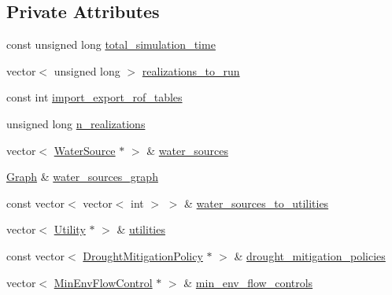 \subsection*{Private Attributes}
\begin{DoxyCompactItemize}
\item 
const unsigned long \mbox{\hyperlink{classSimulation_a6c7ad426929c59e061750b6d923aa859_a6c7ad426929c59e061750b6d923aa859}{total\+\_\+simulation\+\_\+time}}
\item 
vector$<$ unsigned long $>$ \mbox{\hyperlink{classSimulation_a6753fbf18cf9793b0ea3f4c070836af3_a6753fbf18cf9793b0ea3f4c070836af3}{realizations\+\_\+to\+\_\+run}}
\item 
const int \mbox{\hyperlink{classSimulation_a0989380cd166a60c2ba8bb2a1a9c138c_a0989380cd166a60c2ba8bb2a1a9c138c}{import\+\_\+export\+\_\+rof\+\_\+tables}}
\item 
unsigned long \mbox{\hyperlink{classSimulation_ab365c523e28a3af3be06e251b478e2b0_ab365c523e28a3af3be06e251b478e2b0}{n\+\_\+realizations}}
\item 
vector$<$ \mbox{\hyperlink{classWaterSource}{Water\+Source}} $\ast$ $>$ \& \mbox{\hyperlink{classSimulation_a7cf5edb885d26074e51e183408a3adab_a7cf5edb885d26074e51e183408a3adab}{water\+\_\+sources}}
\item 
\mbox{\hyperlink{classGraph}{Graph}} \& \mbox{\hyperlink{classSimulation_a04d4514b77ae98ec66cb8c2d633b2a52_a04d4514b77ae98ec66cb8c2d633b2a52}{water\+\_\+sources\+\_\+graph}}
\item 
const vector$<$ vector$<$ int $>$ $>$ \& \mbox{\hyperlink{classSimulation_ab2825b5561679583c89a3936ce7dea39_ab2825b5561679583c89a3936ce7dea39}{water\+\_\+sources\+\_\+to\+\_\+utilities}}
\item 
vector$<$ \mbox{\hyperlink{classUtility}{Utility}} $\ast$ $>$ \& \mbox{\hyperlink{classSimulation_a0de77bedebd4b324d334340b11f5afa6_a0de77bedebd4b324d334340b11f5afa6}{utilities}}
\item 
const vector$<$ \mbox{\hyperlink{classDroughtMitigationPolicy}{Drought\+Mitigation\+Policy}} $\ast$ $>$ \& \mbox{\hyperlink{classSimulation_a23df9c17244a1cde0e32b42829623724_a23df9c17244a1cde0e32b42829623724}{drought\+\_\+mitigation\+\_\+policies}}
\item 
vector$<$ \mbox{\hyperlink{classMinEnvFlowControl}{Min\+Env\+Flow\+Control}} $\ast$ $>$ \& \mbox{\hyperlink{classSimulation_a91d4cbb85145e9ebb5a9cb5d24dace15_a91d4cbb85145e9ebb5a9cb5d24dace15}{min\+\_\+env\+\_\+flow\+\_\+controls}}
\item 

\end{DoxyCompactItemize}
